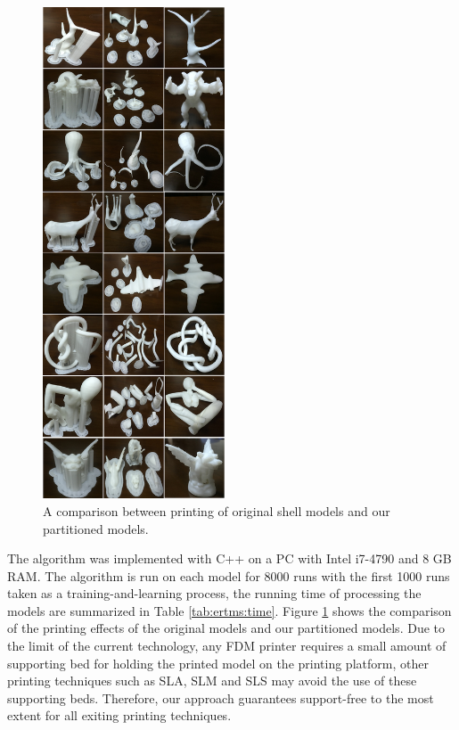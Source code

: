 \begin{figure}[tbp]
  \centering
  \includegraphics[width=0.48\textwidth]{figs/experiment.png}
  \caption{\label{fig:experiment}%
           A comparison between printing of original shell models and our partitioned models.}
\end{figure}

The algorithm was implemented with C++ on a PC with Intel i7-4790 and 8 GB RAM. The algorithm is run on each model for 8000 runs with the first 1000 runs taken as a training-and-learning process, the running time of processing the models are summarized in Table \ref{tab:ertms:time}. Figure \ref{fig:experiment} shows the comparison of the printing effects of the original models and our partitioned models. Due to the limit of the current technology, any FDM printer requires a small amount of supporting bed for holding the printed model on the printing platform, other printing techniques such as SLA, SLM and SLS may avoid the use of these supporting beds. Therefore, our approach guarantees support-free to the most extent for all exiting printing techniques.

